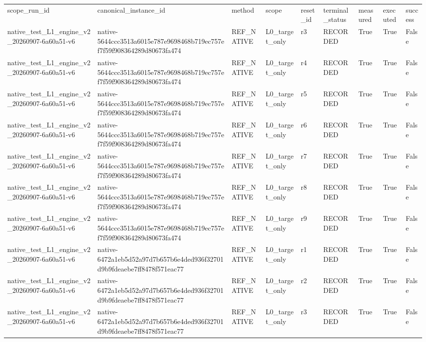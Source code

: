 \begin{tabular}{lllllllll}
scope\_run\_id & canonical\_instance\_id & method & scope & reset\_id & terminal\_status & measured & executed & success \\
native\_test\_L1\_engine\_v2\_20260907-6a60a51-v6 & native-5644ccc3513a6015e787e9698468b719ec757ef7f59f908364289d80673fa474 & REF\_NATIVE & L0\_target\_only & r3 & RECORDED & True & True & False \\
native\_test\_L1\_engine\_v2\_20260907-6a60a51-v6 & native-5644ccc3513a6015e787e9698468b719ec757ef7f59f908364289d80673fa474 & REF\_NATIVE & L0\_target\_only & r4 & RECORDED & True & True & False \\
native\_test\_L1\_engine\_v2\_20260907-6a60a51-v6 & native-5644ccc3513a6015e787e9698468b719ec757ef7f59f908364289d80673fa474 & REF\_NATIVE & L0\_target\_only & r5 & RECORDED & True & True & False \\
native\_test\_L1\_engine\_v2\_20260907-6a60a51-v6 & native-5644ccc3513a6015e787e9698468b719ec757ef7f59f908364289d80673fa474 & REF\_NATIVE & L0\_target\_only & r6 & RECORDED & True & True & False \\
native\_test\_L1\_engine\_v2\_20260907-6a60a51-v6 & native-5644ccc3513a6015e787e9698468b719ec757ef7f59f908364289d80673fa474 & REF\_NATIVE & L0\_target\_only & r7 & RECORDED & True & True & False \\
native\_test\_L1\_engine\_v2\_20260907-6a60a51-v6 & native-5644ccc3513a6015e787e9698468b719ec757ef7f59f908364289d80673fa474 & REF\_NATIVE & L0\_target\_only & r8 & RECORDED & True & True & False \\
native\_test\_L1\_engine\_v2\_20260907-6a60a51-v6 & native-5644ccc3513a6015e787e9698468b719ec757ef7f59f908364289d80673fa474 & REF\_NATIVE & L0\_target\_only & r9 & RECORDED & True & True & False \\
native\_test\_L1\_engine\_v2\_20260907-6a60a51-v6 & native-6472a1eb5d52a97d7b657b6e4ded936f32701d9b9fdeaebe7ff8478f571eac77 & REF\_NATIVE & L0\_target\_only & r1 & RECORDED & True & True & False \\
native\_test\_L1\_engine\_v2\_20260907-6a60a51-v6 & native-6472a1eb5d52a97d7b657b6e4ded936f32701d9b9fdeaebe7ff8478f571eac77 & REF\_NATIVE & L0\_target\_only & r2 & RECORDED & True & True & False \\
native\_test\_L1\_engine\_v2\_20260907-6a60a51-v6 & native-6472a1eb5d52a97d7b657b6e4ded936f32701d9b9fdeaebe7ff8478f571eac77 & REF\_NATIVE & L0\_target\_only & r3 & RECORDED & True & True & False \\

\end{tabular}
